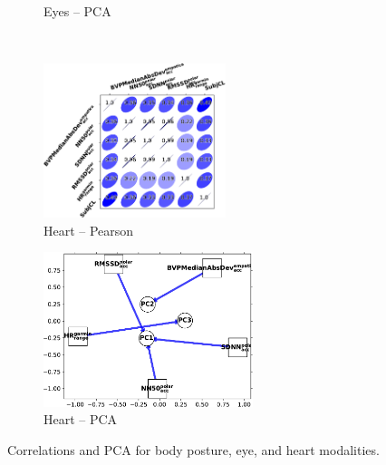 \documentclass[output=paper]{langsci/langscibook}
\begin{document}
\begin{figure}
\begin{subfigure}{0.5\textwidth}
        \caption{Eyes -- PCA}
    \end{subfigure}\bigskip\\
    \begin{subfigure}{0.5\textwidth}\centering
        \includegraphics[height=4.5cm]{figures/heart-pearson-cropped.pdf}
        \caption{Heart -- Pearson}
    \end{subfigure}%
    \begin{subfigure}{0.5\textwidth}\centering
        \includegraphics[height=4.5cm]{figures/heart-PCA-cropped.pdf}
        \caption{Heart -- PCA}
    \end{subfigure}
    \caption{Correlations and PCA for body posture, eye, and heart modalities.\label{fig:plotscorrpca2}}
\end{figure}
\end{document}
